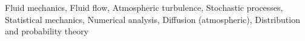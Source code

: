 \documentclass[]{article}
\begin{document}
Fluid mechanics, Fluid flow, Atmospheric turbulence, Stochastic processes, Statistical mechanics, Numerical analysis, Diffusion (atmospheric), Distribution and probability theory
\end{document}
